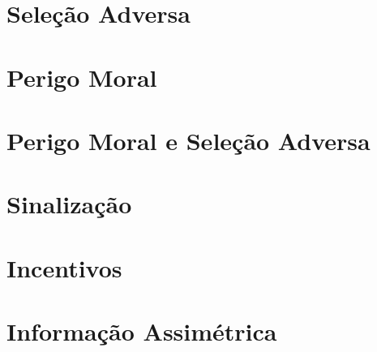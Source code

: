 \documentclass[a4paper,11pt,oneside]{book}
\theoremstyle{definition}
\theoremstyle{break}
\begin{document}
\section{Seleção Adversa}
\section{Perigo Moral}
\section{Perigo Moral e Seleção Adversa}
\section{Sinalização}
\section{Incentivos}
\section{Informação Assimétrica}
\end{document}
